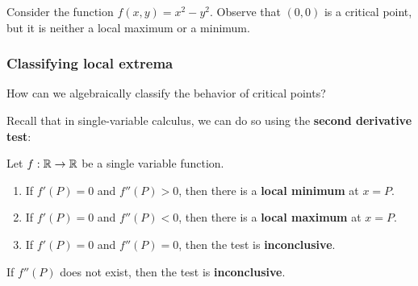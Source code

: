     \begin{example}
        Consider the function $f(x,y) = x^2-y^2$.  Observe that $(0,0)$ is a critical point, but it is neither a local maximum or a minimum.

    \begin{center}
    \end{center}


    \end{example}

\subsubsection{Classifying local extrema}

\begin{motivating}
    How can we algebraically classify the behavior of critical points?
\end{motivating}

Recall that in single-variable calculus, we can do so using the \textbf{second derivative test}:

\begin{theorem}\label{single2ndderiv}

Let $f : \mathbb{R} \to \mathbb{R}$ be a single variable function.

\begin{enumerate}
    \item If $f'(P) = 0$ and $f''(P) > 0$, then there is a \textbf{local minimum} at $x=P$. 
    \item If $f'(P) = 0$ and $f''(P) < 0$, then there is a \textbf{local maximum} at $x=P$. 
    \item If $f'(P) = 0$ and $f''(P) = 0$, then the test is \textbf{inconclusive}.
\end{enumerate}

If $f''(P)$ does not exist, then the test is \textbf{inconclusive}.

\end{theorem}

